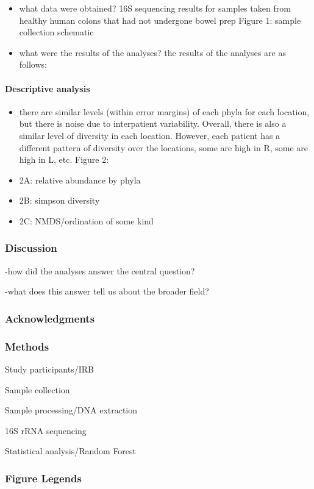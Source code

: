\documentclass[11pt,]{article}
\begin{document}
\begin{itemize}
\item
  what data were obtained? 16S sequencing results for samples taken from
  healthy human colons that had not undergone bowel prep Figure 1:
  sample collection schematic
\item
  what were the results of the analyses? the results of the analyses are
  as follows:
\end{itemize}

\paragraph{Descriptive analysis}\label{descriptive-analysis}

\begin{itemize}
\itemsep1pt\parskip0pt
\item
  there are similar levels (within error margins) of each phyla for each
  location, but there is noise due to interpatient variability. Overall,
  there is also a similar level of diversity in each location. However,
  each patient has a different pattern of diversity over the locations,
  some are high in R, some are high in L, etc. Figure 2:
\item
  2A: relative abundance by phyla
\item
  2B: simpson diversity
\item
  2C: NMDS/ordination of some kind
\end{itemize}

\subsubsection{Discussion}\label{discussion}

-how did the analyses answer the central question?

-what does this answer tell us about the broader field?

\subsubsection{Acknowledgments}\label{acknowledgments}

\subsubsection{Methods}\label{methods}

Study participants/IRB

Sample collection

Sample processing/DNA extraction

16S rRNA sequencing

Statistical analysis/Random Forest

\subsubsection{Figure Legends}\label{figure-legends}
\end{document}

